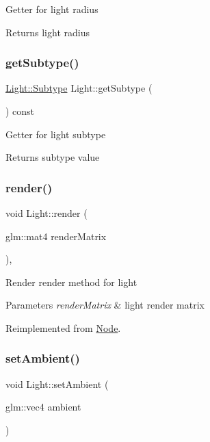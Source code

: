 Getter for light radius \begin{DoxyReturn}{Returns}
light radius 
\end{DoxyReturn}
\mbox{\label{classLight_abe7e9dce915c21865968d0639cde590f}} 
\subsubsection{\texorpdfstring{get\+Subtype()}{getSubtype()}}
{\footnotesize\ttfamily \hyperlink{classLight_a7b5feeb01dd53961e0e523f3d2f5fa7f}{Light\+::\+Subtype} Light\+::get\+Subtype (\begin{DoxyParamCaption}{ }\end{DoxyParamCaption}) const}

Getter for light subtype \begin{DoxyReturn}{Returns}
subtype value 
\end{DoxyReturn}
\mbox{\label{classLight_a069c6888b42eca238328d79b03c3a411}} 
\subsubsection{\texorpdfstring{render()}{render()}}
{\footnotesize\ttfamily void Light\+::render (\begin{DoxyParamCaption}\item[{glm\+::mat4}]{render\+Matrix }\end{DoxyParamCaption})\hspace{0.3cm}{\ttfamily [override]}, {\ttfamily [virtual]}}

Render render method for light 
\begin{DoxyParams}{Parameters}
{\em render\+Matrix} & light render matrix \\
\hline
\end{DoxyParams}


Reimplemented from \hyperlink{classNode_a7faebb78a04b6421dbf5afe998f7658d}{Node}.

\mbox{\label{classLight_a7a9f3b7fa887fc05f09bdbc686582d91}} 
\subsubsection{\texorpdfstring{set\+Ambient()}{setAmbient()}}
{\footnotesize\ttfamily void Light\+::set\+Ambient (\begin{DoxyParamCaption}\item[{glm\+::vec4}]{ambient }\end{DoxyParamCaption})}

